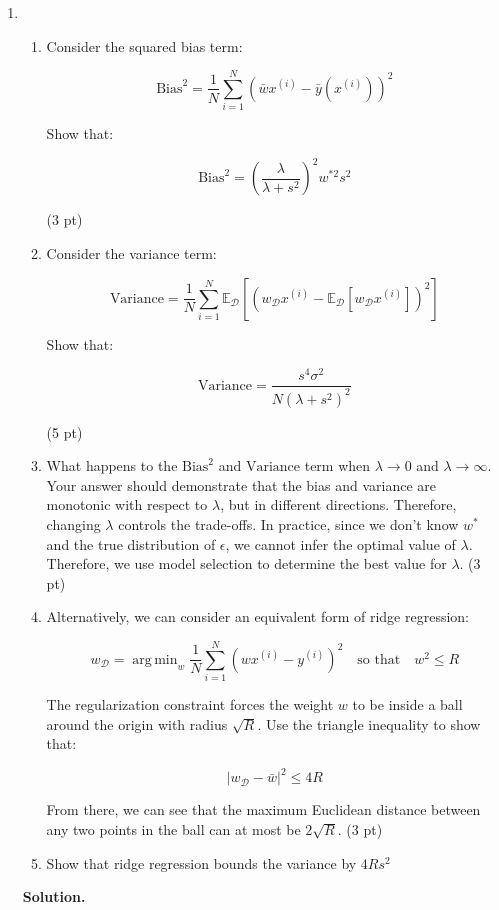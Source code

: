 \documentclass{article}
\DeclareMathOperator*{\argmin}{arg\,min}
\theoremstyle{definition}
\theoremstyle{remark}
\newenvironment{Q}
    {%
      \clearpage
      \item
    }
    {%
      \phantom{s}
      \bigskip
      \textbf{Solution.}
    }
\begin{document}
\begin{enumerate}[font={\Large\bfseries},left=0pt]
\begin{Q}
\begin{enumerate}
			\item Consider the squared bias term:

			      $$
				      \text{Bias}^2 = \frac{1}{N} \sum_{i=1}^N (\bar{w}x^{(i)} - \bar{y}(x^{(i)}))^2
			      $$

			      Show that:

			      $$
				      \text{Bias}^2 = \left( \frac{\lambda}{\lambda + s^2}\right)^2 w^{*2} s^2
			      $$

			      (3 pt)

			\item Consider the variance term:

			      $$
				      \text{Variance} = \frac{1}{N} \sum_{i=1}^N \mathbb{E}_{\mathcal{D}} \left[(w_{\mathcal{D}}x^{(i)} - \mathbb{E}_{\mathcal{D}}[w_{\mathcal{D}} x^{(i)}])^2\right]
			      $$

			      Show that:

			      $$
				      \text{Variance} = \frac{s^4 \sigma^2}{N(\lambda + s^2)^2}
			      $$

			      (5 pt)

			\item What happens to the $\text{Bias}^2$ and $\text{Variance}$ term when $\lambda \to 0$ and $\lambda \to \infty$. Your answer should demonstrate that the bias and variance are monotonic with respect to $\lambda$, but in different directions. Therefore, changing $\lambda$ controls the trade-offs. In practice, since we don't know $w^*$ and the true distribution of $\epsilon$, we cannot infer the optimal value of $\lambda$. Therefore, we use model selection to determine the best value for $\lambda$. (3 pt)

			\item Alternatively, we can consider an equivalent form of ridge regression:

			      $$
				      w_{\mathcal{D}} =\argmin_w \frac{1}{N} \sum_{i=1}^N (wx^{(i)}-y^{(i)})^2 \quad \text{so that} \quad w^2 \leq R
			      $$

			      The regularization constraint forces the weight $w$ to be inside a ball around the origin with radius $\sqrt{R}$. Use the triangle inequality to show that:

			      $$|w_{\mathcal{D}} - \bar{w}|^2 \leq 4R$$

			      From there, we can see that the maximum Euclidean distance between any two points in the ball can at most be $2\sqrt{R}$. (3 pt)

			\item Show that ridge regression bounds the variance by $4Rs^2$


\end{enumerate}
\end{Q}
\end{enumerate}
\end{document}
